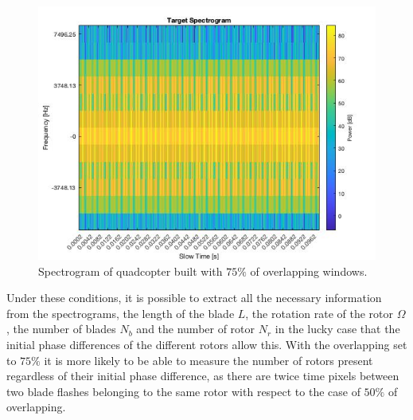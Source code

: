 \begin{figure}[h!]
\centering
\includegraphics[width=12cm]{FMCW mD analysis-chap4/img/quad_spect_max_res_75.jpg}
\caption{Spectrogram of quadcopter built with $75\%$ of overlapping windows.}
\label{generic_f-t_quad}
\end{figure}

Under these conditions, it is possible to extract all the necessary information from the spectrograms, the length of the blade $L$, the rotation rate of the rotor $\Omega$, the number of blades $N_b$ and the number of rotor $N_r$ in the lucky case that the initial phase differences of the different rotors allow this. With the overlapping set to $75\%$ it is more likely to be able to measure the number of rotors present regardless of their initial phase difference, as there are twice time pixels between two blade flashes belonging to the same rotor with respect to the case of $50\%$ of overlapping.\\

